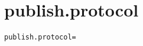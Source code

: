 \section{publish.protocol}
\label{configuration:PublishProtocol}
\AvailableInCsharpOnly{\TODO}
\begin{lstlisting}[style=Props,caption={Usage example for \textit{publish.protocol}}]
publish.protocol=
\end{lstlisting}